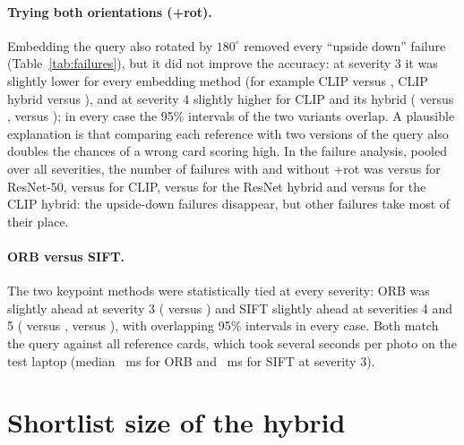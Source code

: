 \paragraph{Trying both orientations (+rot).} Embedding the query also rotated by $180^\circ$ removed every ``upside down'' failure (Table~\ref{tab:failures}), but it did not improve the accuracy: at severity 3 it was slightly lower for every embedding method (for example CLIP  versus , CLIP hybrid  versus ), and at severity 4 slightly higher for CLIP and its hybrid ( versus ,  versus ); in every case the 95\% intervals of the two variants overlap. A plausible explanation is that comparing each reference with two versions of the query also doubles the chances of a wrong card scoring high. In the failure analysis, pooled over all severities, the number of failures with and without +rot was  versus  for ResNet-50,  versus  for CLIP,  versus  for the ResNet hybrid and  versus  for the CLIP hybrid: the upside-down failures disappear, but other failures take most of their place.

\paragraph{ORB versus SIFT.} The two keypoint methods were statistically tied at every severity: ORB was slightly ahead at severity 3 ( versus ) and SIFT slightly ahead at severities 4 and 5 ( versus ,  versus ), with overlapping 95\% intervals in every case. Both match the query against all  reference cards, which took several seconds per photo on the test laptop (median ~ms for ORB and ~ms for SIFT at severity 3).

\section{Shortlist size of the hybrid}
\label{sec:res-ksweep}

